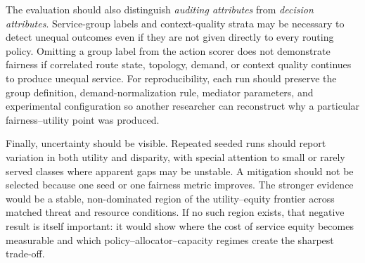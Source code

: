 \documentclass[conference]{IEEEtran}
\begin{document}
The evaluation should also distinguish \emph{auditing attributes} from \emph{decision attributes}. Service-group labels and context-quality strata may be necessary to detect unequal outcomes even if they are not given directly to every routing policy. Omitting a group label from the action scorer does not demonstrate fairness if correlated route state, topology, demand, or context quality continues to produce unequal service. For reproducibility, each run should preserve the group definition, demand-normalization rule, mediator parameters, and experimental configuration so another researcher can reconstruct why a particular fairness--utility point was produced.

Finally, uncertainty should be visible. Repeated seeded runs should report variation in both utility and disparity, with special attention to small or rarely served classes where apparent gaps may be unstable. A mitigation should not be selected because one seed or one fairness metric improves. The stronger evidence would be a stable, non-dominated region of the utility--equity frontier across matched threat and resource conditions. If no such region exists, that negative result is itself important: it would show where the cost of service equity becomes measurable and which policy--allocator--capacity regimes create the sharpest trade-off.

\newpage


\end{document}
